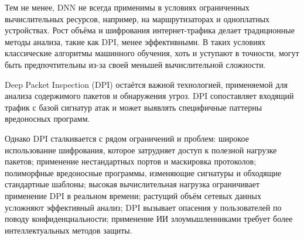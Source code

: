 Тем не менее, DNN не всегда применимы в условиях ограниченных вычислительных ресурсов, например, на маршрутизаторах и одноплатных устройствах. Рост объёма и шифрования интернет-трафика делает традиционные методы анализа, такие как DPI, менее эффективными. В таких условиях классические алгоритмы машинного обучения, хоть и уступают в точности, могут быть предпочтительны из-за своей меньшей вычислительной сложности. %

Deep Packet Inspection (DPI) остаётся важной технологией, применяемой для анализа содержимого пакетов и обнаружения угроз. %
DPI сопоставляет входящий трафик с базой сигнатур атак и может выявлять специфичные паттерны вредоносных программ. %

Однако DPI сталкивается с рядом ограничений и проблем: широкое использование шифрования, которое затрудняет доступ к полезной нагрузке пакетов; применение нестандартных портов и маскировка протоколов; полиморфные вредоносные программы, изменяющие сигнатуры и обходящие стандартные шаблоны; высокая вычислительная нагрузка ограничивает применение DPI в реальном времени; растущий объём сетевых данных усложняют эффективный анализ; DPI вызывает опасения у пользователей по поводу конфиденциальности; применение ИИ злоумышленниками требует более интеллектуальных методов защиты.

